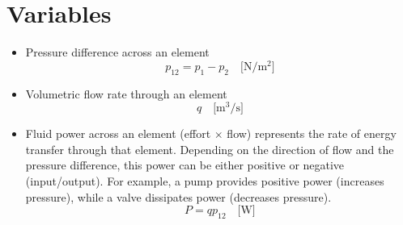 \documentclass[12pt]{article}
\begin{document}
\section*{Variables}
\begin{itemize}
    \item Pressure difference across an element
    \[p_{12}=p_1-p_2\quad\text{[N/m$^2$]}\]
    \item Volumetric flow rate through an element
    \[q \quad\text{[m$^3$/s]}\]
    \item Fluid power across an element (effort $\times$ flow) represents the rate of energy transfer through that element. Depending on the direction of flow and the pressure difference, this power can be either positive or negative (input/output). For example, a pump provides positive power (increases pressure), while a valve dissipates power (decreases pressure).
    \[P=qp_{12}\quad\text{[W]}\]
\end{itemize}
\end{document}
